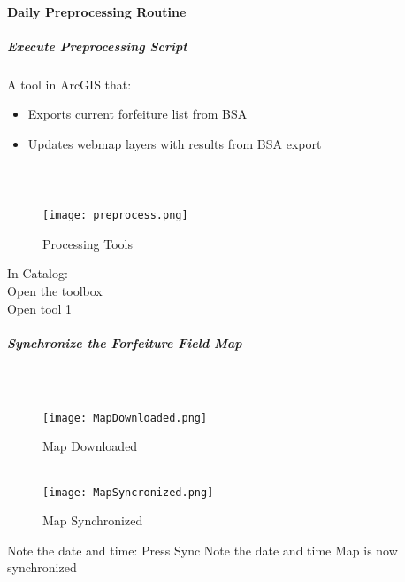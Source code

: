 \documentclass[class=article , crop=false, titlepage, twoside, multi={itemize, figure, verbatim}, float=false]{standalone}
\begin{document}
\paragraph{Daily Preprocessing Routine}
\subparagraph{Execute Preprocessing Script}A tool in ArcGIS that:
\begin{itemize}
\item Exports current forfeiture list from BSA
\item Updates webmap layers with results from BSA export
\end{itemize}
\subparagraph*{\\}
\begin{wrapfigure}{r}{0.75\textwidth}
\centering
\texttt{[image: preprocess.png]}
\caption{Processing Tools}
\end{wrapfigure}
In Catalog:\\
\vspace{1in}
\noindent Open the toolbox\\
\vspace{1in}
\noindent Open tool 1\\
\clearpage
\subparagraph{Synchronize the Forfeiture Field Map\\}
\subparagraph*{\texorpdfstring{\\}{}}
\begin{wrapfigure}{r}{0.5\textwidth}
\centering
\texttt{[image: MapDownloaded.png]}
\caption{Map Downloaded}
\vspace{.25in}
\HRule \\[.4cm] %
\vspace{.25in}
\texttt{[image: MapSyncronized.png]}
\caption{Map Synchronized}
\end{wrapfigure}
\Large Note the date and time:
\vspace{1.5in}
\noindent Press \Large Sync
\vspace{1.5in}
\Large Note the date and time
\vspace{1.5in}
Map is now synchronized
\clearpage
\end{document}
